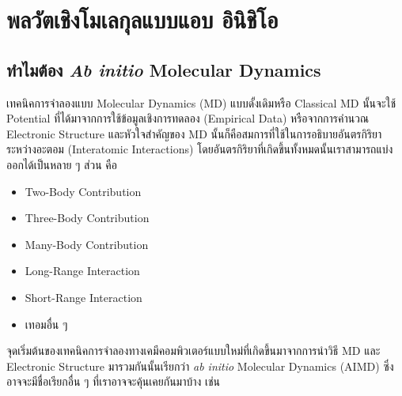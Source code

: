 

\chapter{พลวัตเชิงโมเลกุลแบบแอบ อินิชิโอ}
\label{ch:aimd}

\section{ทำไมต้อง \textit{Ab initio} Molecular Dynamics}

เทคนิคการจำลองแบบ Molecular Dynamics (MD) แบบดั้งเดิมหรือ Classical MD นั้นจะใช้ Potential ที่ได้มาจากการใช้ข้อมูลเชิงการทดลอง
(Empirical Data) หรือจากการคำนวณ Electronic Structure และหัวใจสำคัญของ MD นั้นก็คือสมการที่ใช้ในการอธิบายอันตรกิริยาระหว่างอะตอม
(Interatomic Interactions) โดยอันตรกิริยาที่เกิดขึ้นทั้งหมดนั้นเราสามารถแบ่งออกได้เป็นหลาย ๆ ส่วน คือ

\begin{itemize}[topsep=0pt,noitemsep]
  \setlength\itemsep{1em}
  \item Two-Body Contribution

  \item Three-Body Contribution

  \item Many-Body Contribution

  \item Long-Range Interaction

  \item Short-Range Interaction

  \item เทอมอื่น ๆ
\end{itemize}

จุดเริ่มต้นของเทคนิคการจำลองทางเคมีคอมพิวเตอร์แบบใหม่ที่เกิดขึ้นมาจากการนำวิธี MD และ Electronic Structure มารวมกันนั้นเรียกว่า
\textit{ab initio} Molecular Dynamics (AIMD) ซึ่งอาจจะมีชื่อเรียกอื่น ๆ ที่เราอาจจะคุ้นเคยกันมาบ้าง เช่น

